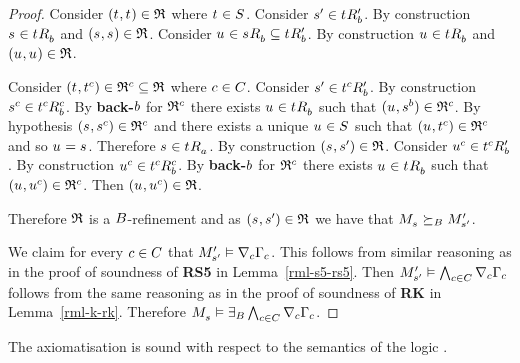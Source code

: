 \begin{proof}
Consider $(\kStateT, \kStateT) \in \refinement$ where $\kStateT \in \kStates$.
Consider $\kStateSP \in \kSuccessorsPB{\kStateT}$.
By construction $\kStateS \in \kSuccessorsB{\kStateT}$ and $(\kStateS, \kStateS) \in \refinement$.
Consider $\kStateU \in \kSuccessorsB{\kStateS} \subseteq \kSuccessorsPB{\kStateT}$.
By construction $\kStateU \in \kSuccessorsB{\kStateT}$ and $(\kStateU, \kStateU) \in \refinement$.

Consider $(\kStateT, \kStateT[\agentC]) \in \refinement^\agentC \subseteq \refinement$ where $\agentC \in \agentsC$.
Consider $\kStateSP \in \kSuccessorsPB{\kStateT[\agentC]}$.
By construction $\kStateS[\agentC] \in \kSuccessorsB[\agentC]{\kStateT[\agentC]}$.
By {\bf back-$\agentB$} for $\refinement^\agentC$ there exists $\kStateU \in \kSuccessorsB{\kStateT}$ such that $(\kStateU, \kStateS[\agentB]) \in \refinement^\agentC$.
By hypothesis $(\kStateS, \kStateS[\agentC]) \in \refinement^\agentC$ and there exists a unique $\kStateU \in \kStates$ such that $(\kStateU, \kStateT[\agentC]) \in \refinement^\agentC$ and so $\kStateU = \kStateS$.
Therefore $\kStateS \in \kSuccessorsA{\kStateT}$.
By construction $(\kStateS, \kStateSP) \in \refinement$.
Consider $\kStateU[\agentC] \in \kSuccessorsPB{\kStateT[\agentC]}$.
By construction $\kStateU[\agentC] \in \kSuccessorsB[\agentC]{\kStateT[\agentC]}$.
By {\bf back-$\agentB$} for $\refinement^\agentC$ there exists $\kStateU \in \kSuccessorsB{\kStateT}$ such that $(\kStateU, \kStateU[\agentC]) \in \refinement^\agentC$.
Then $(\kStateU, \kStateU[\agentC]) \in \refinement$.

Therefore $\refinement$ is a $\agentsB$-refinement and as $(\kStateS, \kStateSP) \in \refinement$ we have that $\kPModel{\kStateS} \simulatesBs \kPModelP{\kStateSP}$.

We claim for every $\agentC \in \agentsC$ that $\kPModelP{\kStateSP} \entails \coversC \Gamma_\agentC$.
This follows from similar reasoning as in the proof of soundness of {\bf RS5} in Lemma~\ref{rml-s5-rs5}.
Then $\kPModelP{\kStateSP} \entails \bigwedge_{\agentC \in \agentsC} \coversC \Gamma_\agentC$ follows from the same reasoning as in the proof of soundness of {\bf RK} in Lemma~\ref{rml-k-rk}.
Therefore $\kPModel{\kStateS} \entails \somerefsBs \bigwedge_{\agentC \in \agentsC} \coversC \Gamma_\agentC$.
\end{proof}

\begin{lemma}\label{rml-s5-soundness}
The axiomatisation \axiomRmlS{} is sound with respect to the semantics of the logic \logicRmlS{}.
\end{lemma}

